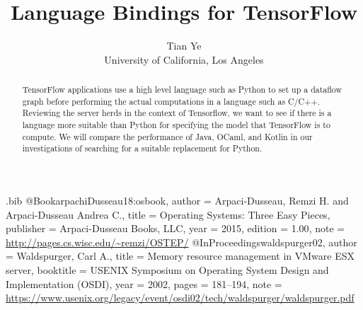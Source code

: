 \usepackage{filecontents}

\begin{filecontents}{\jobname.bib}
@Book{arpachiDusseau18:osbook,
  author =       {Arpaci-Dusseau, Remzi H. and Arpaci-Dusseau Andrea C.},
  title =        {Operating Systems: Three Easy Pieces},
  publisher =    {Arpaci-Dusseau Books, LLC},
  year =         2015,
  edition =      {1.00},
  note =         {\url{http://pages.cs.wisc.edu/~remzi/OSTEP/}}
}
@InProceedings{waldspurger02,
  author =       {Waldspurger, Carl A.},
  title =        {Memory resource management in {VMware ESX} server},
  booktitle =    {USENIX Symposium on Operating System Design and
                  Implementation (OSDI)},
  year =         2002,
  pages =        {181--194},
  note =         {\url{https://www.usenix.org/legacy/event/osdi02/tech/waldspurger/waldspurger.pdf}}}
\end{filecontents}



\date{}

\title{\Large \bf Language Bindings for TensorFlow}

\author{
{\rm Tian Ye}\\
University of California, Los Angeles
} %

\maketitle

\begin{abstract}
TensorFlow applications use a high level language such as Python to set up a dataflow graph before performing the actual computations in a language such as C/C++. Reviewing the server herds in the context of Tensorflow, we want to see if there is a language more suitable than Python for specifying the model that TensorFlow is to compute. We will compare the performance of Java, OCaml, and Kotlin in our investigations of searching for a suitable replacement for Python.
\end{abstract}

